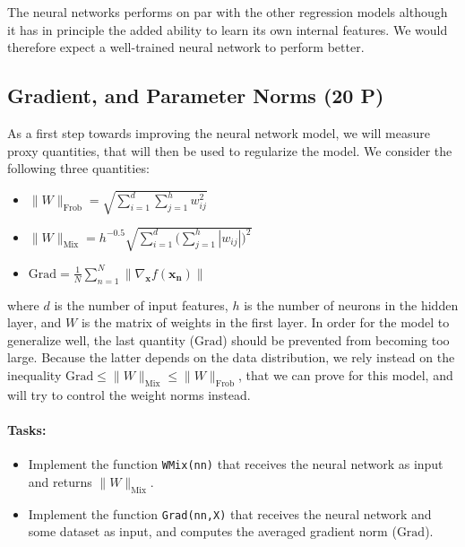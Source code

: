 \documentclass[10pt]{article}
\providecommand{\tightlist}{%
      \setlength{\itemsep}{0pt}\setlength{\parskip}{0pt}}
\begin{document}
    The neural networks performs on par with the other regression models
although it has in principle the added ability to learn its own internal
features. We would therefore expect a well-trained neural network to
perform better.

\subsection{Gradient, and Parameter Norms (20
P)}\label{gradient-and-parameter-norms-20-p}

As a first step towards improving the neural network model, we will
measure proxy quantities, that will then be used to regularize the
model. We consider the following three quantities:

\begin{itemize}
\tightlist
\item
  \(\|W\|_\text{Frob} = \sqrt{\sum_{i=1}^d \sum_{j=1}^h w_{ij}^2}\)
\item
  \(\|W\|_\text{Mix} = h^{-0.5} \sqrt{\sum_{i=1}^d \big(\sum_{j=1}^h | w_{ij}|\big)^2}\)
\item
  \(\text{Grad} = \textstyle \frac1N \sum_{n=1}^N\|\nabla_{\boldsymbol{x}}f (\boldsymbol{x_n})\|\)
\end{itemize}

where \(d\) is the number of input features, \(h\) is the number of
neurons in the hidden layer, and \(W\) is the matrix of weights in the
first layer. In order for the model to generalize well, the last
quantity (\(\text{Grad}\)) should be prevented from becoming too large.
Because the latter depends on the data distribution, we rely instead on
the inequality
\(\text{Grad} \leq \|W\|_\text{Mix} \leq \|W\|_\text{Frob}\), that we
can prove for this model, and will try to control the weight norms
instead.

\paragraph{Tasks:}\label{tasks}

\begin{itemize}
\tightlist
\item
  Implement the function \texttt{WMix(nn)} that receives the neural
  network as input and returns \(\|W\|_\text{Mix}\).
\item
  Implement the function \texttt{Grad(nn,X)} that receives the neural
  network and some dataset as input, and computes the averaged gradient
  norm (\(\text{Grad}\)).
\end{itemize}
\end{document}
